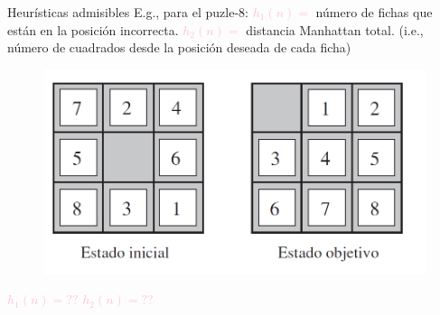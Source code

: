 \begin{frame}{Heurísticas admisibles}
E.g., para el puzle-8: \newline
\textcolor{pink}{$h_1(n) = $}  número de fichas que están en la posición incorrecta.\newline
\textcolor{pink}{$h_2(n) = $}  distancia Manhattan total.\newline
(i.e., número de cuadrados desde la posición deseada de cada ficha)
    \begin{figure}[h]
        \includegraphics[scale = 0.2]{4a_puzle8.png}
    \end{figure}
\textcolor{pink}{$h_1(n) = ??$}\newline
\textcolor{pink}{$h_2(n) = ??$}
\end{frame}
